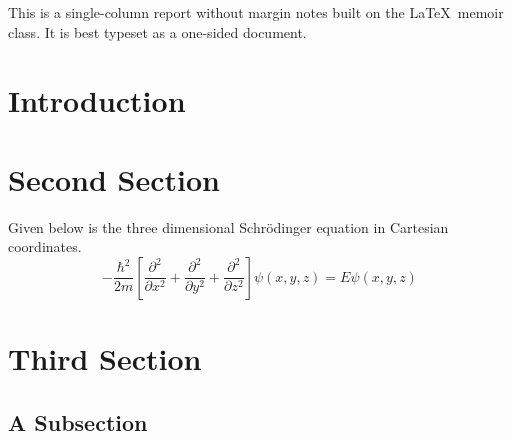 \documentclass[letterpaper,article,11pt,oneside]{memoir}
\title{\doctitle}
\author{\docauthor}
\date{\docdate}
\begin{document}
\maketitle
\thispagestyle{empty}

\noindent This is a single-column report without margin notes built on the \LaTeX\ memoir class. It is best typeset as a one-sided document. 

\section{Introduction}
\lipsum[5]
\section{Second Section}
\lipsum[5]

Given below is the three dimensional Schr\"odinger equation in Cartesian coordinates. 
\begin{equation}\label{eq-schrodinger}
-\frac{\hbar^2}{2m}\left[\frac{\partial^2}{\partial x^2} + \frac{\partial^2}{\partial y^2} + \frac{\partial^2}{\partial z^2}\right]\psi(x,y,z) = E \psi(x,y,z)
\end{equation}

\lipsum[5]

\lipsum[4]

\lipsum[3]

\section{Third Section}

\lipsum[2]

\lipsum[3]

\subsection{A Subsection}

\lipsum[4]
\end{document}
